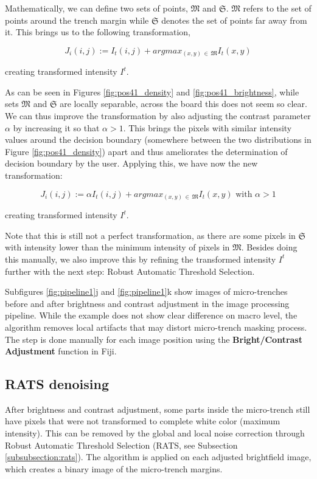 \documentclass[pdftex,12pt,a4paper]{report}
\begin{document}
Mathematically, we can define two sets of points, $\mathfrak{M}$ and $\mathfrak{S}$. $\mathfrak{M}$ refers to the set of points around the trench margin while $\mathfrak{S}$ denotes the set of points far away from it. This brings us to the following transformation,

$$
J_i(i, j) := I_t(i, j) + argmax_{(x, y) \, \in \, \mathfrak{M}}{I_t(x, y)}
$$

creating transformed intensity $I^t$.

As can be seen in Figures \ref{fig:pos41_density} and \ref {fig:pos41_brightness}, while sets $\mathfrak{M}$ and $\mathfrak{S}$ are locally separable, across the board this does not seem so clear. We can thus improve the transformation by also adjusting the contrast parameter $\alpha$ by increasing it so that $\alpha > 1$. This brings the pixels with similar intensity values around the decision boundary (somewhere between the two distributions in Figure \ref{fig:pos41_density}) apart and thus ameliorates the determination of decision boundary by the user. Applying this, we have now the new transformation:

$$
J_i(i, j) := \alpha I_t(i, j) + argmax_{(x, y) \, \in \, \mathfrak{M}}{I_t(x, y)} \text{ with } \alpha > 1
$$

creating transformed intensity $I^t$.

Note that this is still not a perfect transformation, as there are some pixels in $\mathfrak{S}$ with intensity lower than the minimum intensity of pixels in $\mathfrak{M}$. Besides doing this manually, we also improve this by refining the transformed intensity $I^t$ further with the next step: Robust Automatic Threshold Selection.

Subfigures \ref{fig:pipeline1}j and \ref{fig:pipeline1}k show images of micro-trenches before and after brightness and contrast adjustment in the image processing pipeline. While the example does not show clear difference on macro level, the algorithm removes local artifacts that may distort micro-trench masking process. The step is done manually for each image position using the \textbf{Bright/Contrast Adjustment} function in Fiji.

\subsection{RATS denoising}
\label{subsubsection:rats_denoising}

After brightness and contrast adjustment, some parts inside the micro-trench still have pixels  that were not transformed to complete white color (maximum intensity). This can be removed by the global and local noise correction through Robust Automatic Threshold Selection (RATS, see Subsection \ref{subsubsection:rats}). The algorithm is applied on each adjusted brightfield image, which creates a binary image of the micro-trench margins.
\end{document}
